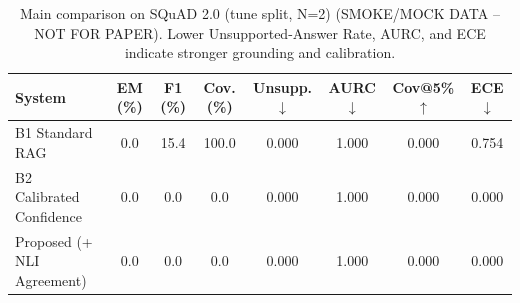 \begin{table}[htbp]
\centering
\caption{Main comparison on SQuAD 2.0 (tune split, N=2) (SMOKE/MOCK DATA -- NOT FOR PAPER). Lower Unsupported-Answer Rate, AURC, and ECE indicate stronger grounding and calibration.}
\label{tab:main_results}
\begin{tabular}{lccccccc}
\toprule
\textbf{System} & \textbf{EM (\%)} & \textbf{F1 (\%)} & \textbf{Cov. (\%)} & \textbf{Unsupp. $\downarrow$} & \textbf{AURC $\downarrow$} & \textbf{Cov@5\% $\uparrow$} & \textbf{ECE $\downarrow$} \\
\midrule
B1 Standard RAG & 0.0 & 15.4 & 100.0 & 0.000 & 1.000 & 0.000 & 0.754 \\
B2 Calibrated Confidence & 0.0 & 0.0 & 0.0 & 0.000 & 1.000 & 0.000 & 0.000 \\
Proposed (+ NLI Agreement) & 0.0 & 0.0 & 0.0 & 0.000 & 1.000 & 0.000 & 0.000 \\
\bottomrule
\end{tabular}
\end{table}